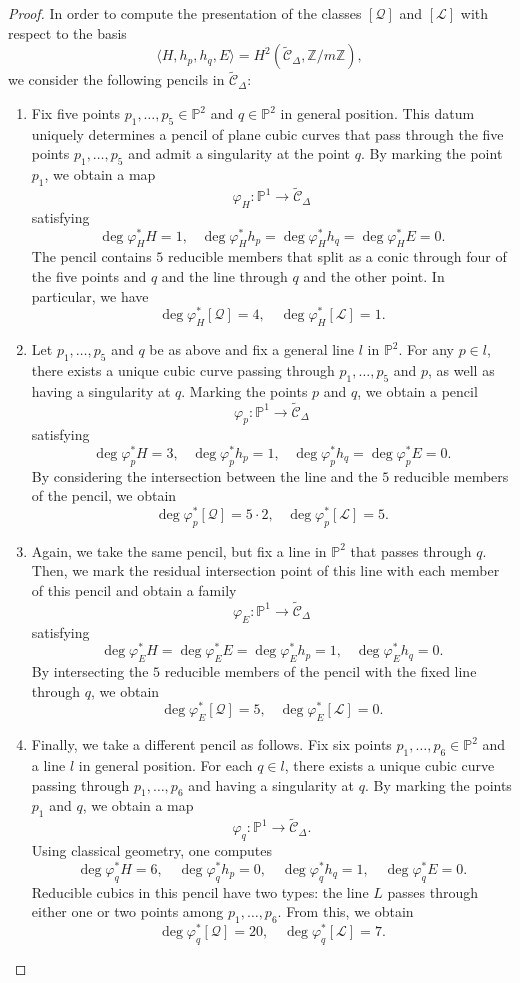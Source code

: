 \documentclass[11pt]{amsart}
\theoremstyle{plain}
\theoremstyle{definition}
\theoremstyle{remark}
\begin{document}
\begin{proof}
In order to compute the presentation of the classes $[\mathcal Q]$ and $[\mathcal L]$ with respect to the basis $$\langle H, h_p, h_q, E \rangle = H^2(\widetilde{\mathcal C}_{\Delta}, \mathbb Z / m \mathbb Z),$$ we consider the following pencils in $\widetilde{\mathcal C}_\Delta$:
\begin{enumerate}
\item Fix five points $p_1, \dots, p_5 \in \mathbb P^2$ and $q \in \mathbb P^2$ in general position. This datum uniquely determines a pencil of plane cubic curves that pass through the five points $p_1, \dots, p_5$ and admit a singularity at the point $q$. By marking the point $p_1$, we obtain a map
$$\varphi_H \colon \mathbb P^1 \to \widetilde{\mathcal C}_\Delta$$
satisfying
$$\deg \varphi_H^* H = 1,\;\;\; \deg \varphi_H^* h_p = \deg \varphi_H^* h_q = \deg \varphi_H^* E = 0.$$
The pencil contains $5$ reducible members that split as a conic through four of the five points and $q$ and the line through $q$ and the other point. In particular, we have
\[
\deg \varphi^*_H [\mathcal Q] = 4, \quad \deg \varphi_H^* [\mathcal L] = 1.
\]
\item Let $p_1,\ldots, p_5$ and $q$ be as above and fix a general line $l$ in $\mathbb P^2$. For any $p\in l$, there exists a unique cubic curve passing through $p_1,\ldots, p_5$ and $p$, as well as having a singularity at $q$. Marking the points $p$ and $q$, we obtain a pencil
$$\varphi_p \colon \mathbb P^1 \to \widetilde{\mathcal C}_\Delta$$
satisfying
$$\deg \varphi_p^*H = 3, \;\;\; \deg \varphi_p^*h_p = 1,  \;\;\; \deg \varphi^*_p h_q = \deg \varphi^*_p E = 0.$$
By considering the intersection between the line and the $5$ reducible members of the pencil, we obtain 
$$\deg \varphi_p^* [\mathcal Q] = 5 \cdot 2, \;\;\;\deg \varphi_p^*[\mathcal{L}] = 5.$$
\item Again, we take the same pencil, but fix a line in $\mathbb P^2$ that passes through $q$. Then, we mark the residual intersection point of this line with each member of this pencil and obtain a family
$$\varphi_E \colon \mathbb P^1 \to \widetilde{\mathcal C}_\Delta$$
satisfying
$$\deg \varphi^*_E H = \deg \varphi^*_E E = \deg \varphi^*_E h_p = 1, \;\;\; \deg \varphi_E^* h_q = 0.$$
By intersecting the $5$ reducible members of the pencil with the fixed line through $q$, we obtain
$$\deg \varphi_E^* [\mathcal Q] =  5, \;\;\; \deg \varphi^*_E [\mathcal L] = 0.$$

\item Finally, we take a different pencil as follows. Fix six points $p_1, \ldots, p_6 \in \mathbb P^2$ and a line $l$ in general position. For each $q\in l$, there exists a unique cubic curve passing through $p_1,\ldots, p_6$ and having a singularity at $q$. By marking the points $p_1$ and $q$, we obtain a map
\[
\varphi_q \colon \mathbb P^1 \to \widetilde{\mathcal{C}}_\Delta.
\]
Using classical geometry, one computes
\[
\deg \varphi_q^* H = 6, \quad \deg \varphi_q^* h_p = 0, \quad \deg \varphi_q^* h_q = 1,\quad \deg \varphi_q^* E = 0.
\]
Reducible cubics in this pencil have two types: the line $L$ passes through either one or two points among $p_1,\ldots, p_6$. From this, we obtain
\[
\deg \varphi^*_q [\mathcal Q] = 20, \quad \deg \varphi_q^* [\mathcal L] = 7.
\]


\end{enumerate}
\end{proof}
\end{document}
